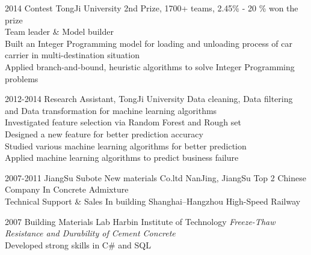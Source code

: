 \documentclass[]{friggeri-cv} %
\begin{document}
\begin{entrylist}
\entry
{2014}
{Contest }
{TongJi University}
{2nd Prize, 1700+ teams, 2.45\% - 20 \% won the prize\\
Team leader \& Model builder \\
Built an Integer Programming model for loading and unloading process of car carrier in multi-destination situation\\
Applied branch-and-bound, heuristic algorithms to solve Integer Programming problems
}

\entry
{2012-2014}
{Research Assistant, }
{TongJi University}
{Data cleaning, Data filtering and Data transformation for machine learning algorithms\\
 Investigated feature selection via Random Forest and Rough set\\
 Designed a new feature for better prediction accuracy\\
 Studied various machine learning algorithms for better prediction\\
 Applied machine learning algorithms to predict business failure
}



\entry
{2007-2011}
{JiangSu Subote New materials Co.ltd}
{NanJing, JiangSu}
{Top 2 Chinese Company In Concrete Admixture\\
Technical Support \& Sales In building Shanghai–Hangzhou High-Speed Railway\\}


\entry
{2007}
{Building Materials Lab}
{Harbin Institute of Technology}
{\emph{Freeze-Thaw Resistance and Durability of Cement Concrete}\\
Developed strong skills in C\# and SQL\\
}


\end{entrylist}
\end{document}
